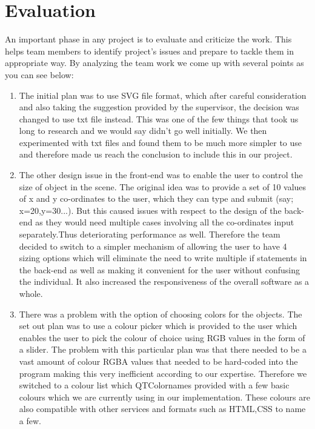 \documentclass{article}
\begin{document}
 \newpage
\newpage


\section{Evaluation}

An important phase in any project is to evaluate and criticize the work. This helps team members to identify project's issues and prepare to tackle them in appropriate way. By analyzing the team work we come up with several points as you can see below:
\begin{enumerate}
    
    \item 	The initial plan was to use SVG file format, which after careful consideration and also taking the suggestion provided by the supervisor, the decision was changed to use txt file instead. This was one of the few things that took us long to research and we would say didn’t go well initially. We then experimented with txt files and found them to be much more simpler to use and therefore made us reach the conclusion to include this in our project. 
\item 	 The other design issue in the front-end was to enable the user to control the size of  object in the scene. The original idea was to provide a set of 10 values of x and y co-ordinates to the user, which they can type and submit (say; x=20,y=30...). But this caused issues with respect to the design of the back-end as they would need multiple cases involving all the co-ordinates input separately.Thus deteriorating performance as well. Therefore the team decided to switch to a simpler mechanism of allowing the user to have 4 sizing options which will eliminate the need to write multiple if statements in the back-end as well as making it convenient for the user without confusing the individual. It also increased the responsiveness of the overall software as a whole.  
\item 	There was a problem with the option of choosing colors for the objects. The set out plan was to use a colour picker which is provided to the user which enables the user to pick the colour of choice using RGB values in the form of a slider.  The problem with this particular plan was that there needed to be a vast amount  of colour RGBA values that needed to be hard-coded into the program making this very inefficient according to our expertise. Therefore we switched to a colour list which QTColornames provided with a few basic colours which we are currently using in our implementation. These colours are also compatible with other services and formats such as HTML,CSS to name a few. 

\end{enumerate}
\end{document}
